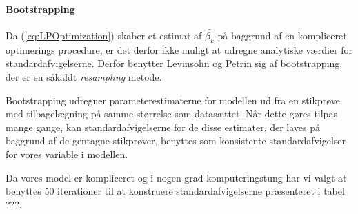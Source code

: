 \paragraph{Bootstrapping}
Da (\ref{eq:LPOptimization}) skaber et estimat af $\hat{\beta_k}$ på baggrund af en kompliceret optimerings procedure, er det derfor ikke muligt at udregne analytiske værdier for standardafvigelserne. Derfor benytter Levinsohn og Petrin sig af bootstrapping, der er en såkaldt \emph{resampling} metode.

Bootstrapping udregner parameterestimaterne for modellen ud fra en stikprøve med tilbagelægning på samme størrelse som datasættet. Når dette gøres tilpas mange gange, kan standardafvigelserne for de disse estimater, der laves på baggrund af de gentagne stikprøver, benyttes som konsistente standardafvigelser for vores variable i modellen.

Da vores model er kompliceret og i nogen grad komputeringstung har vi valgt at benyttes 50 iterationer til at konstruere standardafvigelserne præsenteret i tabel ???.